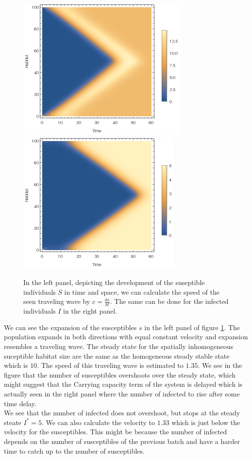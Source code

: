 \begin{figure}
\centering
\includegraphics[scale=0.5]{img/listdensityplot_S.png}
\includegraphics[scale=0.5]{img/listdensityplot_P.png}
\caption{\label{fig:pic1c} In the left panel, depicting the development of the suseptible individuals $S$ in time and space, we can calculate the speed of the seen traveling wave by $c=\frac{\delta x}{\delta t}$. The same can be done for the infected individuals $I$ in the right panel.}
\end{figure}

We can see the expansion of the susceptibles $s$ in the left panel of figure \ref{fig:pic1c}. The population expands in both directions with equal constant velocity and expansion resembles a traveling wave. The steady state for the spatially inhomogeneous suceptible habitat size are the same as the homogeneous steady stable state which is $10$. The speed of this traveling wave is estimated to $1.35$. We see in the figure that the number of susceptibles overshoots over the steady state, which might suggest that the   Carrying capacity term of the system is delayed which is actually seen in the right panel where the number of infected to rise after some time delay. \\

We see that the number of infected does not overshoot, but stops at the steady steate $I^*=5$. We can also calculate the velocity to $1.33$ which is just below the velocity for the susceptibles. This might be because the number of infected depends on the number of susceptibles of the previous batch and have a harder time to catch up to the number of susceptibles.